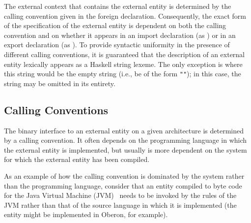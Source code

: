 \documentclass[a4paper,twoside]{article}
\newcommand{\code}[1]{\texttt{#1}}      %
\begin{document}
The external context that contains the external entity is determined by the
calling convention given in the foreign declaration.  Consequently, the exact
form of the specification of the external entity is dependent on both the
calling convention and on whether it appears in an import declaration (as
) or in an export declaration (as ).  To provide
syntactic uniformity in the presence of different calling conventions, it is
guaranteed that the description of an external entity lexically appears as a
Haskell string lexeme.  The only exception is where this string would be the
empty string (i.e., be of the form \code{""}); in this case, the string may be
omitted in its entirety.

\subsection{Calling Conventions}
\label{sec:call-conv}

The binary interface to an external entity on a given architecture is
determined by a calling convention.  It often depends on the programming
language in which the external entity is implemented, but usually is more
dependent on the system for which the external entity has been compiled.

As an example of how the calling convention is dominated by the system rather
than the programming language, consider that an entity compiled to byte code
for the Java Virtual Machine (JVM)~\cite{lindholm-etal:JVM} needs to be
invoked by the rules of the JVM rather than that of the source language in
which it is implemented (the entity might be implemented in Oberon, for
example).
\end{document}
